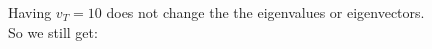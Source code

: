 \documentclass[preview]{standalone}
\begin{document}
\begin{center}
\raggedright
                Having $v_T = 10$ does not change the the eigenvalues or eigenvectors. \\
                  So we still get:
\end{center}
\end{document}
